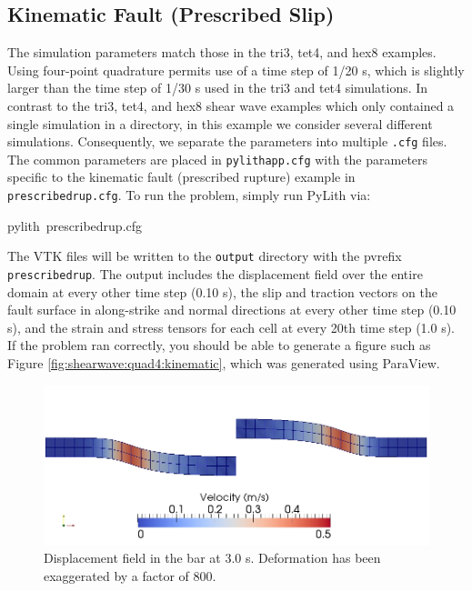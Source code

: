 \subsection{Kinematic Fault (Prescribed Slip)}

The simulation parameters match those in the tri3, tet4, and hex8
examples. Using four-point quadrature permits use of a time step of
1/20 s, which is slightly larger than the time step of 1/30 s used
in the tri3 and tet4 simulations. In contrast to the tri3, tet4, and
hex8 shear wave examples which only contained a single simulation
in a directory, in this example we consider several different simulations.
Consequently, we separate the parameters into multiple \texttt{.cfg}
files. The common parameters are placed in \texttt{pylithapp.cfg}
with the parameters specific to the kinematic fault (prescribed rupture)
example in \texttt{prescribedrup.cfg}. To run the problem, simply
run PyLith via:
\begin{lyxcode}
pylith~prescribedrup.cfg
\end{lyxcode}
The VTK files will be written to the \texttt{output} directory with
the pvrefix \texttt{prescribedrup}. The output includes the displacement
field over the entire domain at every other time step (0.10 s), the
slip and traction vectors on the fault surface in along-strike and
normal directions at every other time step (0.10 s), and the strain
and stress tensors for each cell at every 20th time step (1.0 s).
If the problem ran correctly, you should be able to generate a figure
such as Figure \vref{fig:shearwave:quad4:kinematic}, which was generated
using ParaView.

\noindent \begin{center}
\begin{figure}
\begin{centering}
\includegraphics[scale=0.5]{tutorials/shearwave/figs/quad4kinematic30}
\par\end{centering}

\caption{Displacement field in the bar at 3.0 s. Deformation has been exaggerated
by a factor of 800.\label{fig:shearwave:quad4:kinematic}}
\end{figure}

\par\end{center}



